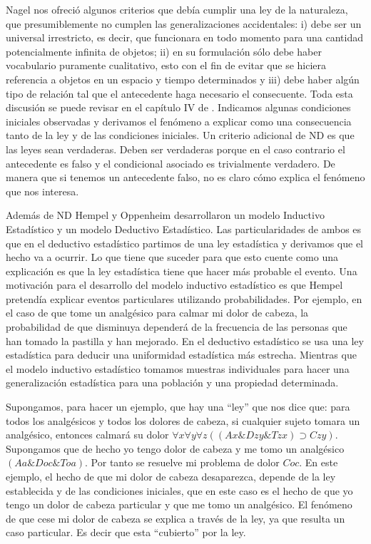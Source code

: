 Nagel nos ofreció algunos criterios que debía cumplir una ley de la naturaleza, que presumiblemente no cumplen las generalizaciones accidentales: i) debe ser un universal irrestricto, es decir, que funcionara en todo momento para una cantidad potencialmente infinita de objetos; ii) en su formulación sólo debe haber vocabulario puramente cualitativo, esto con el fin de evitar que se hiciera referencia a objetos en un espacio y tiempo determinados y iii) debe haber algún tipo de relación tal que el antecedente haga necesario el consecuente. Toda esta discusión se puede revisar en el capítulo IV de \cite{Nagel2006}. Indicamos algunas condiciones iniciales observadas y derivamos el fenómeno a explicar como una consecuencia tanto de la ley y de las condiciones iniciales. Un criterio adicional de ND es que las leyes sean verdaderas. Deben ser verdaderas porque en el caso contrario el antecedente es falso y el condicional asociado es trivialmente verdadero. De manera que si tenemos un antecedente falso, no es claro cómo explica el fenómeno que nos interesa.

Además de ND Hempel y Oppenheim desarrollaron un modelo Inductivo Estadístico y un modelo Deductivo Estadístico. Las particularidades de ambos es que en el deductivo estadístico partimos de una ley estadística y derivamos que el hecho va a ocurrir. Lo que tiene que suceder para que esto cuente como una explicación es que la ley estadística tiene que hacer más probable el evento. Una motivación para el desarrollo del modelo inductivo estadístico es que Hempel pretendía explicar eventos particulares utilizando probabilidades. Por ejemplo, en el caso de que tome un analgésico para calmar mi dolor de cabeza, la probabilidad de que disminuya dependerá de la frecuencia de las personas que han tomado la pastilla y han mejorado. En el deductivo estadístico se usa una ley estadística para deducir una uniformidad estadística más estrecha. Mientras que el modelo inductivo estadístico tomamos muestras individuales para hacer una generalización estadística para una población y una propiedad determinada.

Supongamos, para hacer un ejemplo, que hay una ``ley'' que nos dice que: para todos los analgésicos y todos los dolores de cabeza, si cualquier sujeto tomara un analgésico, entonces calmará su dolor $\forall{x}\forall{y}\forall{z}((Ax\&Dzy\&Tzx)\supset Czy)$. Supongamos que de hecho yo tengo dolor de cabeza y me tomo un analgésico $(Aa \& Doc \& Toa)$. Por tanto se resuelve mi problema de dolor $Coc$. En este ejemplo, el hecho de que mi dolor de cabeza desaparezca, depende de la ley establecida y de las condiciones iniciales, que en este caso es el hecho de que yo tengo un dolor de cabeza particular y que me tomo un analgésico. El fenómeno de que cese mi dolor de cabeza se explica a través de la ley, ya que resulta un caso particular. Es decir que esta ``cubierto'' por la ley.

